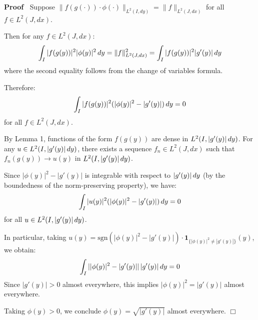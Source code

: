 \documentclass{article}
\newenvironment{proof}{\noindent\textbf{Proof\ }}{\hspace*{\fill}$\Box$\medskip}
\begin{document}
\begin{proof}
  Suppose $\|f (g (\cdot)) \cdot \phi (\cdot)\|_{L^2 (I, dy)} = \|f\|_{L^2 (J,
  dx)}$ for all $f \in L^2 (J, dx)$.
  
  Then for any $f \in L^2 (J, dx)$:
  \begin{equation}
    \int_I |f (g (y)) |^2 | \phi (y) |^2 \hspace{0.17em} dy =\|f\|_{L^2 (J,
    dx)}^2 = \int_I |f (g (y)) |^2 |g' (y) |  \hspace{0.17em} dy
  \end{equation}
  where the second equality follows from the change of variables formula.
  
  Therefore:
  \begin{equation}
    \int_I |f (g (y)) |^2  (| \phi (y) |^2 - |g' (y) |)  \hspace{0.17em} dy =
    0
  \end{equation}
  for all $f \in L^2 (J, dx)$.
  
  By Lemma 1, functions of the form $f (g (y))$ are dense in $L^2 (I, |g' (y)
  | \hspace{0.17em} dy)$. For any $u \in L^2 (I, |g' (y) | \hspace{0.17em}
  dy)$, there exists a sequence $f_n \in L^2 (J, dx)$ such that $f_n (g (y))
  \to u (y)$ in $L^2 (I, |g' (y) | \hspace{0.17em} dy)$.
  
  Since $| \phi (y) |^2 - |g' (y) |$ is integrable with respect to $|g' (y) | 
  \hspace{0.17em} dy$ (by the boundedness of the norm-preserving property), we
  have:
  \begin{equation}
    \int_I |u (y) |^2  (| \phi (y) |^2 - |g' (y) |)  \hspace{0.17em} dy = 0
  \end{equation}
  for all $u \in L^2 (I, |g' (y) | \hspace{0.17em} dy)$.
  
  In particular, taking $u (y) = \text{sgn} (| \phi (y) |^2 - |g' (y) |) \cdot
  \textbf{1}_{\{| \phi (y) |^2 \neq |g' (y) |\}} (y)$, we obtain:
  \begin{equation}
    \int_I || \phi (y)  |^2 - |g' (y) || \hspace{0.17em} |g' (y) | 
    \hspace{0.17em} dy = 0
  \end{equation}
  Since $|g' (y) | > 0$ almost everywhere, this implies $| \phi (y) |^2 = |g'
  (y) |$ almost everywhere.
  
  Taking $\phi (y) > 0$, we conclude $\phi (y) = \sqrt{|g' (y) |}$ almost
  everywhere.
\end{proof}
\end{document}
